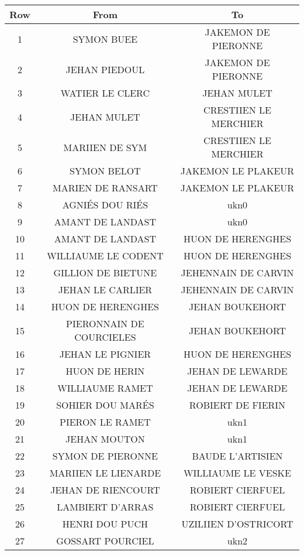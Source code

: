 \small
\begin{center}
    \begin{longtable}{|c|c|c|}
\hline	Row	&	From	&	To	\\
\hline	1	&	SYMON BUEE	&	JAKEMON DE PIERONNE	\\
\hline	2	&	JEHAN PIEDOUL	&	JAKEMON DE PIERONNE	\\
\hline	3	&	WATIER LE CLERC	&	JEHAN MULET	\\
\hline	4	&	JEHAN MULET	&	CRESTIIEN LE MERCHIER	\\
\hline	5	&	MARIIEN DE SYM	&	CRESTIIEN LE MERCHIER	\\
\hline	6	&	SYMON BELOT	&	JAKEMON LE PLAKEUR	\\
\hline	7	&	MARIEN DE RANSART	&	JAKEMON LE PLAKEUR	\\
\hline	8	&	AGNIÉS DOU RIÉS	&	ukn0	\\
\hline	9	&	AMANT DE LANDAST	&	ukn0	\\
\hline	10	&	AMANT DE LANDAST	&	HUON DE HERENGHES	\\
\hline	11	&	WILLIAUME LE CODENT	&	HUON DE HERENGHES	\\
\hline	12	&	GILLION DE BIETUNE	&	JEHENNAIN DE CARVIN	\\
\hline	13	&	JEHAN LE CARLIER	&	JEHENNAIN DE CARVIN	\\
\hline	14	&	HUON DE HERENGHES	&	JEHAN BOUKEHORT	\\
\hline	15	&	PIERONNAIN DE COURCIELES	&	JEHAN BOUKEHORT	\\
\hline	16	&	JEHAN LE PIGNIER	&	HUON DE HERENGHES	\\
\hline	17	&	HUON DE HERIN	&	JEHAN DE LEWARDE	\\
\hline	18	&	WILLIAUME RAMET	&	JEHAN DE LEWARDE	\\
\hline	19	&	SOHIER DOU MARÉS	&	ROBIERT DE FIERIN	\\
\hline	20	&	PIERON LE RAMET	&	ukn1	\\
\hline	21	&	JEHAN MOUTON	&	ukn1	\\
\hline	22	&	SYMON DE PIERONNE	&	BAUDE L'ARTISIEN	\\
\hline	23	&	MARIIEN LE LIENARDE	&	WILLIAUME LE VESKE	\\
\hline	24	&	JEHAN DE RIENCOURT	&	ROBIERT CIERFUEL	\\
\hline	25	&	LAMBIERT D'ARRAS	&	ROBIERT CIERFUEL	\\
\hline	26	&	HENRI DOU PUCH	&	UZILIIEN D'OSTRICORT	\\
\hline	27	&	GOSSART POURCIEL	&	ukn2	\\

\end{longtable}
\end{center}
